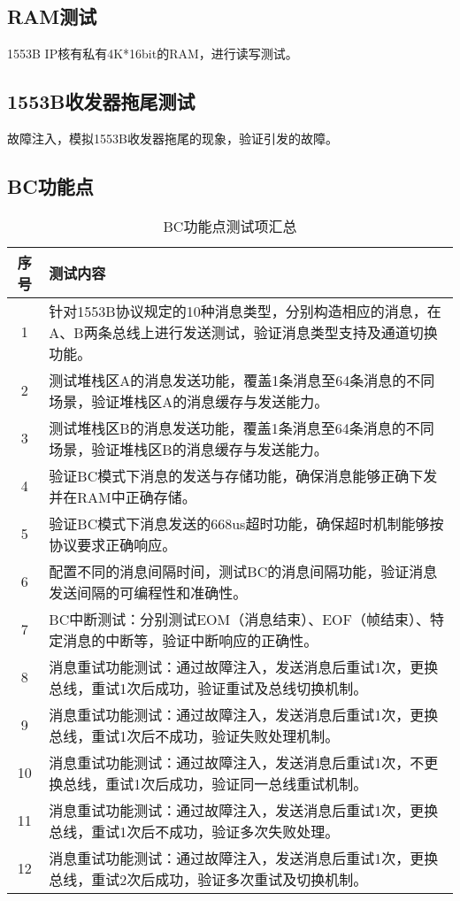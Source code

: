 \documentclass[fontset=windows]{article}
\begin{document}
\subsection{RAM测试}
1553B IP核有私有4K*16bit的RAM，进行读写测试。

\subsection{1553B收发器拖尾测试}
故障注入，模拟1553B收发器拖尾的现象，验证引发的故障。



\subsection{BC功能点}

\begin{table}[H]
    \centering
    \begin{tabular}{|c|p{11cm}|}
        \hline
        序号 & 测试内容 \\
        \hline
        1  & 针对1553B协议规定的10种消息类型，分别构造相应的消息，在A、B两条总线上进行发送测试，验证消息类型支持及通道切换功能。 \\
        2  & 测试堆栈区A的消息发送功能，覆盖1条消息至64条消息的不同场景，验证堆栈区A的消息缓存与发送能力。 \\
        3  & 测试堆栈区B的消息发送功能，覆盖1条消息至64条消息的不同场景，验证堆栈区B的消息缓存与发送能力。 \\
        4  & 验证BC模式下消息的发送与存储功能，确保消息能够正确下发并在RAM中正确存储。 \\
        5  & 验证BC模式下消息发送的668us超时功能，确保超时机制能够按协议要求正确响应。 \\
        6  & 配置不同的消息间隔时间，测试BC的消息间隔功能，验证消息发送间隔的可编程性和准确性。 \\
        7  & BC中断测试：分别测试EOM（消息结束）、EOF（帧结束）、特定消息的中断等，验证中断响应的正确性。 \\
        8  & 消息重试功能测试：通过故障注入，发送消息后重试1次，更换总线，重试1次后成功，验证重试及总线切换机制。 \\
        9  & 消息重试功能测试：通过故障注入，发送消息后重试1次，更换总线，重试1次后不成功，验证失败处理机制。 \\
        10 & 消息重试功能测试：通过故障注入，发送消息后重试1次，不更换总线，重试1次后成功，验证同一总线重试机制。 \\
        11 & 消息重试功能测试：通过故障注入，发送消息后重试1次，更换总线，重试1次后不成功，验证多次失败处理。 \\
        12 & 消息重试功能测试：通过故障注入，发送消息后重试1次，更换总线，重试2次后成功，验证多次重试及切换机制。 \\
        \hline
    \end{tabular}
    \caption{BC功能点测试项汇总}
    \label{tab:bc-feature-summary}
\end{table}
\end{document}
